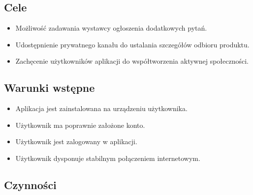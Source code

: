 \documentclass[licencjacka]{pracamgr}
\begin{document}
    \subsection{Cele}
    \begin{itemize}
        \item Możliwość zadawania wystawcy ogłoszenia dodatkowych pytań.
        \item Udostępnienie prywatnego kanału do ustalania szczegółów odbioru produktu.
        \item Zachęcenie użytkowników aplikacji do współtworzenia aktywnej społeczności.
    \end{itemize}
    \subsection{Warunki wstępne}
    \begin{itemize}
        \item Aplikacja jest zainstalowana na urządzeniu użytkownika.
        \item Użytkownik ma poprawnie założone konto.
        \item Użytkownik jest zalogowany w aplikacji.
        \item Użytkownik dysponuje stabilnym połączeniem internetowym.
    \end{itemize}
    \subsection{Czynności}\label{r:czynnosci-link}
\end{document}
